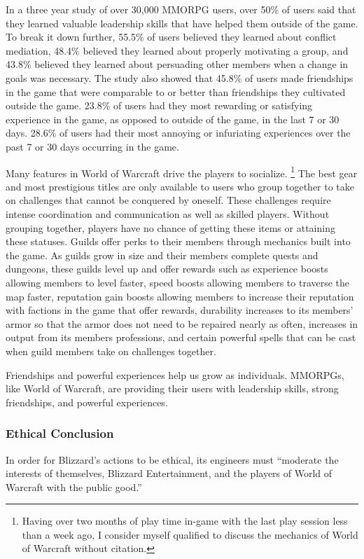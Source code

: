 \documentclass[11pt]{article}
\begin{document}
\begin{multicols}{2}
In a three year study of over 30,000 MMORPG users, over 50\% of users said that they learned valuable leadership skills that have helped them outside of the game. \cite{MotivationsAndDerviedExperiences} To break it down further, 55.5\% of users believed they learned about conflict mediation, 48.4\% believed they learned about properly motivating a group, and 43.8\% believed they learned about persuading other members when a change in goals was necessary. \cite{MotivationsAndDerviedExperiences}
The study also showed that 45.8\% of users made friendships in the game that were comparable to or better than friendships they cultivated outside the game. 23.8\% of users had they most rewarding or satisfying experience in the game, as opposed to outside of the game, in the last 7 or 30 days. 28.6\% of users had their most annoying or infuriating experiences over the past 7 or 30 days occurring in the game. \cite{MotivationsAndDerviedExperiences}

Many features in World of Warcraft drive the players to socialize. \footnote{Having over two months of play time in-game with the last play session less than a week ago, I consider myself qualified to discuss the mechanics of World of Warcraft without citation.} The best gear and most prestigious titles are only available to users who group together to take on challenges that cannot be conquered by oneself. These challenges require intense coordination and communication as well as skilled players. Without grouping together, players have no chance of getting these items or attaining these statuses.
Guilds offer perks to their members through mechanics built into the game. As guilds grow in size and their members complete quests and dungeons, these guilds level up and offer rewards such as experience boosts allowing members to level faster, speed boosts allowing members to traverse the map faster, reputation gain boosts allowing members to increase their reputation with factions in the game that offer rewards, durability increases to its members' armor so that the armor does not need to be repaired nearly as often, increases in output from its members professions, and certain powerful spells that can be cast when guild members take on challenges together.

Friendships and powerful experiences help us grow as individuals. MMORPGs, like World of Warcraft, are providing their users with leadership skills, strong friendships, and powerful experiences.

\subsubsection{Ethical Conclusion}
In order for Blizzard's actions to be ethical, its engineers must ``moderate the interests of themselves, Blizzard Entertainment, and the players of World of Warcraft with the public good.''


\end{multicols}
\end{document}

